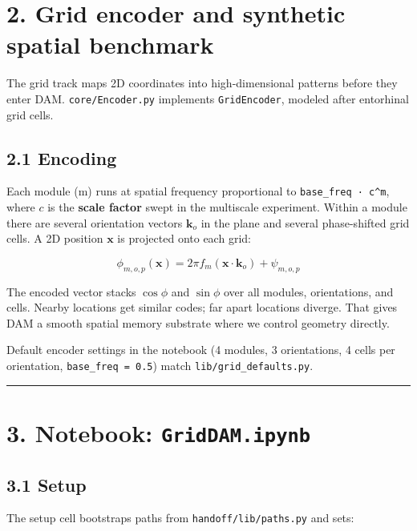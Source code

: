 \documentclass[
  11pt,
]{memoir}
\begin{document}
\section{2. Grid encoder and synthetic spatial
benchmark}\label{grid-encoder-and-synthetic-spatial-benchmark}

The grid track maps 2D coordinates into high-dimensional patterns before
they enter DAM. \texttt{core/Encoder.py} implements
\texttt{GridEncoder}, modeled after entorhinal grid cells.

\subsection{2.1 Encoding}\label{encoding}

Each module (m) runs at spatial frequency proportional to
\texttt{base\_freq\ ·\ c\^{}m}, where $c$ is the \textbf{scale factor}
swept in the multiscale experiment. Within a module there are several
orientation vectors $\mathbf{k}_{o}$ in the plane and several
phase-shifted grid cells. A 2D position $\mathbf{x}$ is projected onto
each grid:

\[
\phi_{m,o,p}(\mathbf{x}) = 2\pi f_m (\mathbf{x} \cdot \mathbf{k}_o) + \psi_{m,o,p}
\]

The encoded vector stacks $\cos\phi$ and $\sin\phi$ over all modules,
orientations, and cells. Nearby locations get similar codes; far apart
locations diverge. That gives DAM a smooth spatial memory substrate
where we control geometry directly.

Default encoder settings in the notebook (4 modules, 3 orientations, 4
cells per orientation, \texttt{base\_freq\ =\ 0.5}) match
\texttt{lib/grid\_defaults.py}.

\begin{center}\rule{0.5\linewidth}{0.5pt}\end{center}

\section{\texorpdfstring{3. Notebook:
\texttt{GridDAM.ipynb}}{3. Notebook: GridDAM.ipynb}}\label{notebook-griddam.ipynb}

\subsection{3.1 Setup}\label{setup}

The setup cell bootstraps paths from \texttt{handoff/lib/paths.py} and
sets:
\end{document}
